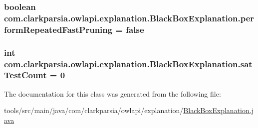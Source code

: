 \hypertarget{classcom_1_1clarkparsia_1_1owlapi_1_1explanation_1_1_black_box_explanation_a68b64f097123e3d846cc0fcefe706f24}{
\subsubsection[{perform\-Repeated\-Fast\-Pruning}]{\setlength{\rightskip}{0pt plus 5cm}boolean com.\-clarkparsia.\-owlapi.\-explanation.\-Black\-Box\-Explanation.\-perform\-Repeated\-Fast\-Pruning = false\hspace{0.3cm}{\ttfamily [private]}}}\label{classcom_1_1clarkparsia_1_1owlapi_1_1explanation_1_1_black_box_explanation_a68b64f097123e3d846cc0fcefe706f24}
\hypertarget{classcom_1_1clarkparsia_1_1owlapi_1_1explanation_1_1_black_box_explanation_a113c010a09e1cb814cb9db633196bfe8}{
\subsubsection[{sat\-Test\-Count}]{\setlength{\rightskip}{0pt plus 5cm}int com.\-clarkparsia.\-owlapi.\-explanation.\-Black\-Box\-Explanation.\-sat\-Test\-Count = 0\hspace{0.3cm}{\ttfamily [private]}}}\label{classcom_1_1clarkparsia_1_1owlapi_1_1explanation_1_1_black_box_explanation_a113c010a09e1cb814cb9db633196bfe8}


The documentation for this class was generated from the following file\-:\begin{DoxyCompactItemize}
\item 
tools/src/main/java/com/clarkparsia/owlapi/explanation/\hyperlink{_black_box_explanation_8java}{Black\-Box\-Explanation.\-java}\end{DoxyCompactItemize}
